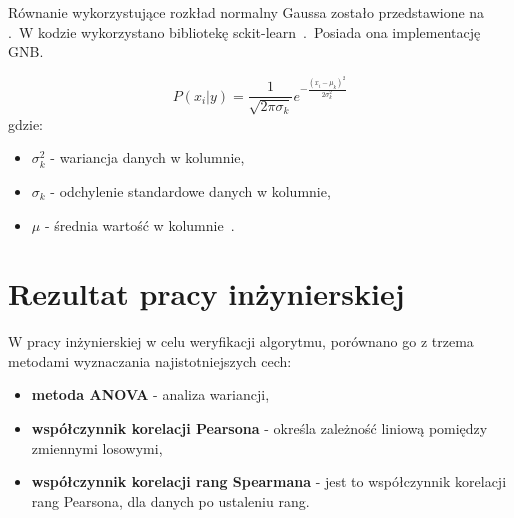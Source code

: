 Równanie wykorzystujące rozkład normalny Gaussa zostało przedstawione na .\ W kodzie wykorzystano bibliotekę sckit-learn~\cite{scikit-learn}.\ Posiada ona implementację GNB.

\begin{equation}\label{math:gnb}
    P(x_{i}|y) = \frac{1}{\sqrt{2\pi\sigma_{k}}}e^{-\frac{(x_{i}-\mu_{k})^2}{2\sigma_{k}^{2}}}
\end{equation}
gdzie:
\begin{itemize}
        \item[] \textbf{$\sigma_{k}^{2}$} - wariancja danych w kolumnie,
        \item[] \textbf{$\sigma_{k}$} - odchylenie standardowe danych w kolumnie,
        \item[] \textbf{$\mu$} - średnia wartość w kolumnie~\cite{Leung2007}.
\end{itemize}

\section{Rezultat pracy inżynierskiej}
W pracy inżynierskiej w celu weryfikacji algorytmu, porównano go z trzema metodami wyznaczania najistotniejszych cech:
\begin{itemize}
    \item \textbf{metoda ANOVA} - analiza wariancji,
    \item \textbf{współczynnik korelacji Pearsona} - określa zależność liniową pomiędzy zmiennymi losowymi,
    \item \textbf{współczynnik korelacji rang Spearmana} - jest to współczynnik korelacji rang Pearsona, dla danych po ustaleniu rang.
\end{itemize}

